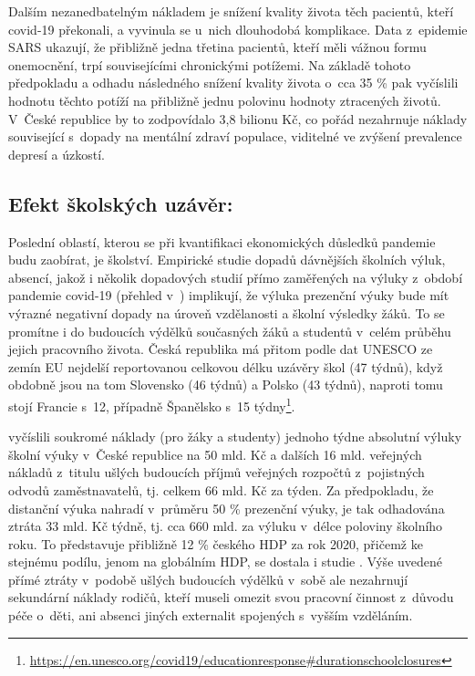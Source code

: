 Dalším nezanedbatelným nákladem je snížení kvality života těch pacientů, kteří covid-19 překonali, a vyvinula se u~nich dlouhodobá komplikace. Data z~epidemie SARS ukazují, že přibližně jedna třetina pacientů, kteří měli vážnou formu onemocnění, trpí souvisejícími chronickými potížemi. Na základě tohoto předpokladu a odhadu následného snížení kvality života o~cca 35 \% pak \cite{Cutler2020} vyčíslili hodnotu těchto potíží na přibližně jednu polovinu hodnoty ztracených životů. V~České republice by to zodpovídalo 3,8 bilionu Kč, co pořád nezahrnuje náklady související s~dopady na mentální zdraví populace, viditelné ve zvýšení prevalence depresí a úzkostí.

\subsection*{Efekt \v{s}kolsk\'{y}ch uz\'{a}v\v{e}r:} 

Poslední oblastí, kterou se při kvantifikaci ekonomických důsledků pandemie budu zaobírat, je školství. Empirické studie dopadů dávnějších školních výluk, absencí, jakož i několik dopadových studií přímo zaměřených na výluky z~období pandemie covid-19 (přehled v~\cite{Jann2021}) implikují, že výluka prezenční výuky bude mít výrazné negativní dopady na úroveň vzdělanosti a školní výsledky žáků. To se promítne i do budoucích výdělků současných žáků a studentů v~celém průběhu jejich pracovního života. Česká republika má přitom podle dat UNESCO ze zemín EU nejdelší reportovanou celkovou délku uzávěry škol (47 týdnů), když obdobně jsou na tom Slovensko (46 týdnů) a Polsko (43 týdnů), naproti tomu stojí Francie s~12, případně Španělsko s~15 týdny\footnote{\url{https://en.unesco.org/covid19/educationresponse\#durationschoolclosures}}.

\cite{Jann2021} vyčíslili soukromé náklady (pro žáky a studenty) jednoho týdne absolutní výluky školní výuky v~České republice na 50 mld. Kč a dalších 16 mld. veřejných nákladů z~titulu ušlých budoucích příjmů veřejných rozpočtů z~pojistných odvodů zaměstnavatelů, tj. celkem 66 mld. Kč za týden. Za předpokladu, že distanční výuka nahradí v~průměru 50 \% prezenční výuky, je tak odhadována ztráta 33 mld. Kč týdně, tj. cca 660 mld. za výluku v~délce poloviny školního roku. To představuje přibližně 12 \% českého HDP za rok 2020, přičemž ke stejnému podílu, jenom na globálním HDP, se dostala i studie \cite{Azevedo2020}. Výše uvedené přímé ztráty v~podobě ušlých budoucích výdělků v~sobě ale nezahrnují sekundární náklady rodičů, kteří museli omezit svou pracovní činnost z~důvodu péče o~děti, ani absenci jiných externalit spojených s~vyšším vzděláním.

